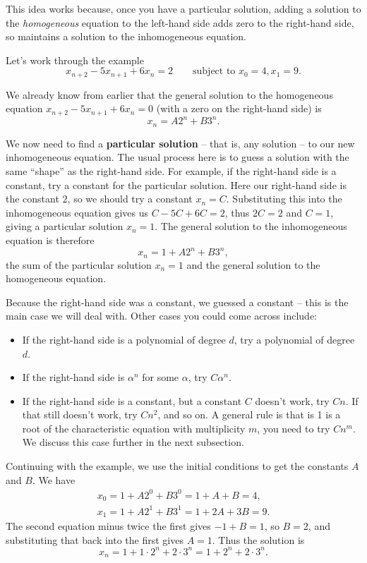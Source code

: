 \documentclass[
  a4paper,
]{article}
\providecommand{\tightlist}{%
  \setlength{\itemsep}{0pt}\setlength{\parskip}{0pt}}
\theoremstyle{definition}
\theoremstyle{definition}
\theoremstyle{definition}
\theoremstyle{remark}
\begin{document}
This idea works because, once you have a particular solution, adding a solution to the \emph{homogeneous} equation to the left-hand side adds zero to the right-hand side, so maintains a solution to the inhomogeneous equation.

Let's work through the example
\[ x_{n+2} - 5x_{n+1} + 6x_{n} = 2 \qquad \text{subject to } x_0 = 4, x_1 = 9 . \]

We already know from earlier that the general solution to the homogeneous equation \(x_{n+2} - 5x_{n+1} + 6x_{n} = 0\) (with a zero on the right-hand side) is
\[ x_n = A2^n + B3^n . \]

We now need to find a \textbf{particular solution} -- that is, any solution -- to our new inhomogeneous equation. The usual process here is to guess a solution with the same ``shape'' as the right-hand side. For example, if the right-hand side is a constant, try a constant for the particular solution. Here our right-hand side is the constant \(2\), so we should try a constant \(x_n = C\). Substituting this into the inhomogeneous equation gives us \(C - 5C + 6C = 2\), thus \(2C = 2\) and \(C = 1\), giving a particular solution \(x_n = 1\). The general solution to the inhomogeneous equation is therefore
\[ x_n = 1 + A2^n + B3^n , \]
the sum of the particular solution \(x_n = 1\) and the general solution to the homogeneous equation.

Because the right-hand side was a constant, we guessed a constant -- this is the main case we will deal with. Other cases you could come across include:

\begin{itemize}
\tightlist
\item
  If the right-hand side is a polynomial of degree \(d\), try a polynomial of degree \(d\).
\item
  If the right-hand side is \(\alpha^n\) for some \(\alpha\), try \(C\alpha^n\).
\item
  If the right-hand side is a constant, but a constant \(C\) doesn't work, try \(Cn\). If that still doesn't work, try \(Cn^2\), and so on. A general rule is that is 1 is a root of the characteristic equation with multiplicity \(m\), you need to try \(Cn^m\). We discuss this case further in the next subsection.
\end{itemize}

Continuing with the example, we use the initial conditions to get the constants \(A\) and \(B\). We have
\begin{gather*}
x_0 = 1 + A2^0 + B3^0 = 1+ A + B = 4 , \\
x_1 = 1 + A2^1 + B3^1 = 1+ 2A + 3B = 9 .
\end{gather*}
The second equation minus twice the first gives \(-1 + B = 1\), so \(B=2\), and substituting that back into the first gives \(A = 1\). Thus the solution is
\[ x_n = 1 + 1\cdot 2^n + 2 \cdot 3^n = 1 + 2^n + 2 \cdot 3^n . \]
\end{document}
